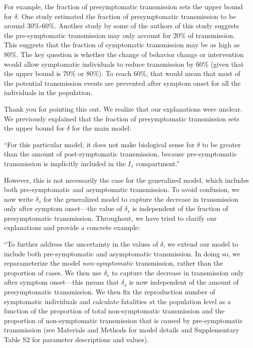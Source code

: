 \documentclass[12pt]{article}
\newcommand{\revtext}{\textsf}
\begin{document}
\revtext{For example, the fraction of presymptomatic transmission sets the upper bound for $\delta$. One study estimated the fraction of presymptomatic transmission to be around 30\%-60\%. Another study by some of the authors of this study suggests the pre-symptomatic transmission may only account for 20\% of transmission. This suggests that the fraction of symptomatic transmission may be as high as 80\%. The key question is whether the change of behavior change or intervention would allow symptomatic individuals to reduce transmission by 60\% (given that the upper bound is 70\% or 80\%). To reach 60\%, that would mean that most of the potential transmission events are prevented after symptom onset for all the individuals in the population.}

Thank you for pointing this out. We realize that our explanations were unclear. We previously explained that the fraction of presymptomatic transmission sets the upper bound for $\delta$ for the main model:

``For this particular model, it does not make biological sense for $\delta$ to be greater than the amount of post-symptomatic transmission, because pre-symptomatic transmission is implicitly included in the $I_s$ compartment.''

However, this is not necessarily the case for the generalized model, which includes both pre-symptomatic and asymptomatic transmission. 
To avoid confusion, we now write $\delta_s$ for the generalized model to capture the decrease in transmission only after symptom onset---the value of $\delta_s$ is independent of the fraction of presymptomatic transmission.
Throughout, we have tried to clarify our explanations and provide a concrete example:

``To further address the uncertainty in the values of $\delta$, we extend our model to include both pre-symptomatic and asymptomatic transmission.
In doing so, we reparameterize the model \textit{non-symptomatic} transmission, rather than the proportion of cases.
We then use $\delta_s$ to capture the decrease in transmission only after symptom onset---this means that $\delta_s$ is now independent of the amount of presymptomatic transmission.
We then fix the reproduction number of symptomatic individuals and calculate fatalities at the population level as a function of the proportion of total non-symptomatic transmission and the proportion of non-symptomatic transmission that is caused by pre-symptomatic transmission (see Materials and Methods for model details and Supplementary Table S2 for parameter descriptions and values).
\end{document}
